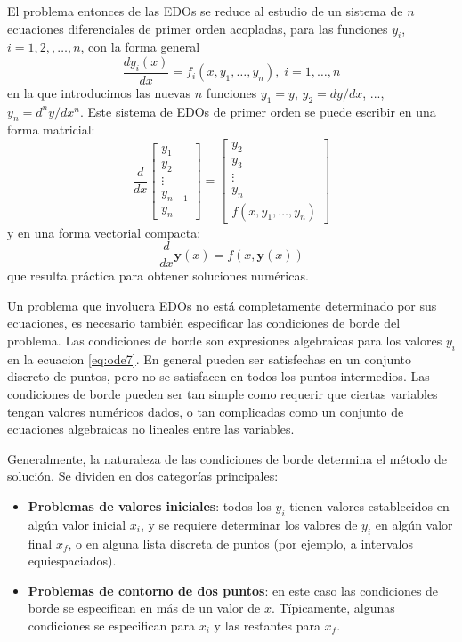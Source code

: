 El problema entonces de las EDOs se reduce al estudio de un sistema de $n$ ecuaciones diferenciales de primer orden acopladas, para las funciones $y_i$, $i = 1, 2, ,\ldots, n$, con la forma general
\begin{equation} \label{eq:ode7}
 \frac{dy_i(x)}{dx} = f_i(x, y_1, \ldots, y_n), \; i = 1,\ldots,n
\end{equation} 
en la que introducimos las nuevas $n$ funciones $y_1 = y$, $y_2 = dy/dx$, ..., $y_n = d^ny/dx^n$. Este sistema de EDOs de primer orden se puede escribir en una forma matricial:
\begin{equation} \label{eq:matricial}
 \frac{d}{dx}
 \begin{bmatrix}
  y_1 \\
  y_2 \\
  \vdots \\
  y_{n-1} \\
  y_n
 \end{bmatrix} =
 \begin{bmatrix}
  y_2 \\
  y_3 \\
  \vdots \\
  y_n \\
  f(x, y_1, \ldots, y_n)
 \end{bmatrix}
\end{equation} 
y en una forma vectorial compacta:
\begin{equation}\label{eq:estandar}
 \frac{d}{dx} \bm{y}(x) = f(x, \bm{y}(x))
\end{equation} 
que resulta práctica para obtener soluciones numéricas.

Un problema que involucra EDOs no está completamente determinado por sus ecuaciones, es necesario también especificar las condiciones de borde del problema. Las condiciones de borde son expresiones algebraicas para los valores $y_i$ en la ecuacion \ref{eq:ode7}. En general pueden ser satisfechas en un conjunto discreto de puntos, pero no se satisfacen en todos los puntos intermedios. Las condiciones de borde pueden ser tan simple como requerir que ciertas variables tengan valores numéricos dados, o tan complicadas como un conjunto de ecuaciones algebraicas no lineales entre las variables.

Generalmente, la naturaleza de las condiciones de borde determina el método de solución. Se dividen en dos categorías principales:
\begin{itemize}
 \item \textbf{Problemas de valores iniciales}: todos los $y_i$ tienen valores establecidos en algún valor inicial $x_i$, y se requiere determinar los valores de $y_i$ en algún valor final $x_f$, o en alguna lista discreta de puntos (por ejemplo, a intervalos equiespaciados).
 \item  \textbf{Problemas de contorno de dos puntos}: en este caso las condiciones de borde se especifican en más de un valor de $x$. Típicamente, algunas condiciones se especifican para $x_i$ y las restantes para $x_f$.
\end{itemize}

